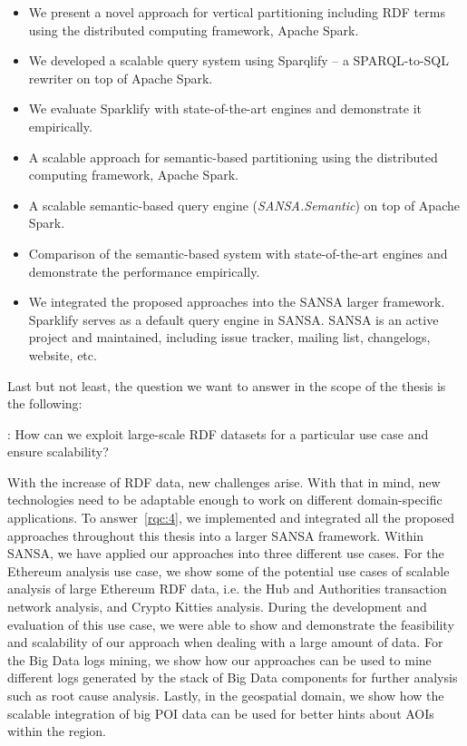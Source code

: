 \begin{itemize}
 \item We present a novel approach for vertical partitioning including \gls{RDF} terms using the distributed computing framework, Apache Spark.
 \item We developed a scalable query system using Sparqlify -- a SPARQL-to-SQL rewriter on top of Apache Spark.
 \item We evaluate Sparklify with state-of-the-art engines and demonstrate it empirically.
 \item A scalable approach for semantic-based partitioning using the distributed computing framework, Apache Spark.
 \item A scalable semantic-based query engine (\textit{SANSA.Semantic}) on top of Apache Spark.
 \item Comparison of the semantic-based system with state-of-the-art engines and demonstrate the performance empirically.
 \item We integrated the proposed approaches into the SANSA larger framework.
 Sparklify serves as a default query engine in SANSA.
 SANSA is an active project and maintained, including issue tracker, mailing list, changelogs, website, etc.
\end{itemize}

Last but not least, the question we want to answer in the scope of the thesis is the following:

\begin{tcolorbox}
\textbf{\rqNr[RQ4]\label{rqc:4}}: How can we exploit large-scale \gls{RDF} datasets for a particular use case and ensure scalability?
\end{tcolorbox}

With the increase of \gls{RDF} data, new challenges arise.
With that in mind, new technologies need to be adaptable enough to work on different domain-specific applications.
To answer~\ref{rqc:4}, we implemented and integrated all the proposed approaches throughout this thesis into a larger SANSA framework.
Within SANSA, we have applied our approaches into three different use cases.
For the Ethereum analysis use case, we show some of the potential use cases of scalable analysis of large Ethereum \gls{RDF} data, i.e. the Hub and Authorities transaction network analysis, and Crypto Kitties analysis.
During the development and evaluation of this use case, we were able to show and demonstrate the feasibility and scalability of our approach when dealing with a large amount of data.
For the Big Data logs mining, we show how our approaches can be used to mine different logs generated by the stack of Big Data components for further analysis such as root cause analysis.
Lastly, in the geospatial domain, we show how the scalable integration of big \gls{POI} data can be used for better hints about \gls{AOI}s within the region.



